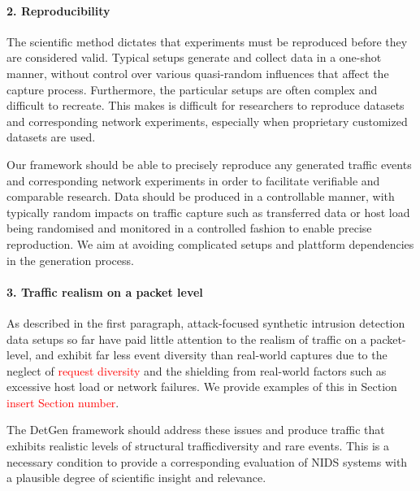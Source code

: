 \documentclass[sigconf]{acmart}
\begin{document}
\paragraph{2. Reproducibility} The scientific method dictates that experiments must be reproduced  before  they  are  considered  valid. Typical setups generate and collect data in a one-shot manner, without control over various quasi-random influences that affect the capture process. Furthermore, the particular setups are often complex and difficult to recreate. This makes is difficult for researchers to reproduce datasets and corresponding network experiments, especially when proprietary customized datasets are used. 

Our framework should be able to precisely reproduce any generated traffic events and corresponding network experiments in order to facilitate verifiable and comparable research. Data should be produced in a controllable manner, with typically random impacts on traffic capture such as transferred data or host load being randomised and monitored in a controlled fashion to enable precise reproduction. We aim at avoiding complicated setups and plattform dependencies in the generation process. 

\paragraph{3. Traffic realism on a packet level} As described in the first paragraph, attack-focused synthetic intrusion detection data setups so far have paid little attention to the realism of traffic on a packet-level, and exhibit far less event diversity than real-world captures due to the neglect of \textcolor{red}{request diversity} and the shielding from real-world factors such as excessive host load or network failures. We provide examples of this in Section \textcolor{red}{insert Section number}.

The DetGen framework should address these issues and produce traffic that exhibits realistic levels of structural trafficdiversity and rare events. This is a necessary condition to provide a corresponding evaluation of NIDS systems with a plausible degree of scientific insight and relevance. %
\end{document}
